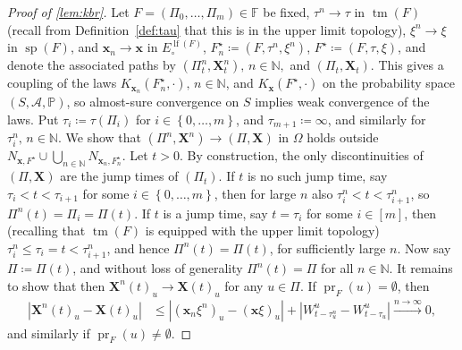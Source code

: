 \documentclass[reqno,draft]{amsart}
\numberwithin{equation}{section}
\theoremstyle{plain}
\theoremstyle{remark}
\newcommand{\N}{\mathbb{N}} %
\newcommand{\A}{\mathcal{A}} %
\renewcommand{\P}{\mathbb{P}} %
\newcommand{\tendsto}[1]{\stackrel{#1}{\longrightarrow}}
\DeclareMathOperator{\pr}{pr}
\newcommand{\fpart}{\Pi} %
\DeclareMathOperator{\lf}{lf}
\DeclareMathOperator{\dct}{tm}
\DeclareMathOperator{\dcs}{sp}
\newcommand{\kbr}{K} %
\begin{document}
\begin{proof}[Proof of \cref{lem:kbr}]
    Let $F = (\fpart_0, \ldots ,\fpart_m) \in \mathbb{F}$ be fixed, $\tau^n \to \tau$ in $\dct(F)$ (recall from Definition~\ref{def:tau} that this is in the upper limit topology), $\xi^n \to \xi$ in $\dcs(F)$, and $\boldsymbol x_n \to \boldsymbol x$ in $E_\circ ^{\lf(F)}$, $F^\star_n \coloneqq (F,\tau^n,\xi^n)$, $F^\star \coloneqq (F,\tau,\xi)$, and denote the associated paths by $(\fpart^n_t,\boldsymbol X^n_t),\,n\in \N,$ and $(\fpart_t,\boldsymbol X_t)$. This gives a coupling of the laws $\kbr_{\boldsymbol x_n}(F^\star_n,\cdot ),\, n\in \N$, and $\kbr_{\boldsymbol x}(F^\star,\cdot )$ on the probability space $(S, \A, \P)$, so almost-sure convergence on $S$ implies weak convergence of the laws. Put $\tau_i \coloneqq \tau(\fpart_i)$ for $i\in \left\{ 0, \ldots ,m \right\} $, and $\tau_{m+1}\coloneqq \infty$, and similarly for $\tau_i^n,\, n\in \N$. 
    We show that $(\fpart^n,\boldsymbol X^n) \to (\fpart,\boldsymbol X)$ in $\Omega$ holds outside $N_{\boldsymbol x,F^\star}\cup\bigcup_{n\in \N} N_{\boldsymbol x_n,F^\star_n}$.
    Let $t > 0$. By construction, the only discontinuities of $(\fpart,\boldsymbol X)$ are the jump times of $(\fpart_t)$. If $t$ is no such jump time, say $\tau_i < t < \tau_{i+1}$ for some $i \in \left\{ 0, \ldots ,m \right\} $, then for large $n$ also $\tau^n_i < t < \tau^n_{i+1}$, so $\fpart^n(t) = \fpart_i = \fpart(t)$. If $t$ is a jump time, say $t = \tau_i$ for some $i \in [m]$, then (recalling that $\dct(F)$ is equipped with the upper limit topology) $\tau_{i}^n \le \tau_i = t < \tau_{i+1}^n$, and hence $\fpart^n(t) = \fpart(t)$, for sufficiently large $n$.
    Now say $\fpart \coloneqq \fpart(t)$, and without loss of generality $\fpart^n(t) = \fpart$ for all $n\in \N$.
    It remains to show that then $\boldsymbol X^n(t)_u \to \boldsymbol X(t)_u$ for any $u\in \fpart$. If $\pr_F(u) = \emptyset $, then
    \begin{align*}
        \left| \boldsymbol X^n(t)_u - \boldsymbol X(t)_u \right| 
         &\le \left| (\boldsymbol x_n\xi^n)_u - (\boldsymbol x\xi)_u \right| + \left| W^u_{t-\tau_u^n} - W^u_{t-\tau_u} \right| 
        \tendsto{n\to \infty} 0,
    \end{align*}
    and similarly if $\pr_F(u) \neq \emptyset $.


\end{proof}
\end{document}
